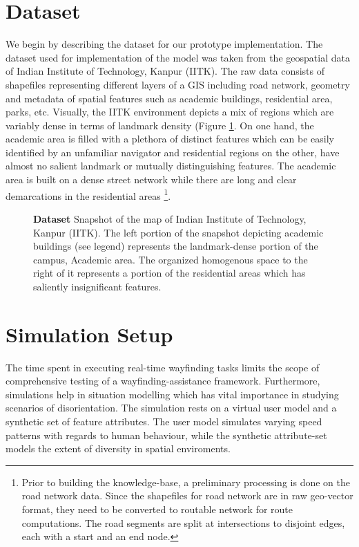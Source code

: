 \documentclass{iitkthesis}
\begin{document}
 \label{evaluation}
 \section{Dataset}
We begin by describing the dataset for our prototype implementation. The dataset used for implementation of the model was taken from the geospatial data of Indian Institute of Technology, Kanpur (IITK). The raw data consists of shapefiles representing different layers of a GIS including road network, geometry and metadata of spatial features such as academic buildings, residential area, parks, etc. Visually, the IITK environment depicts a mix of regions which are variably dense in terms of landmark density (Figure \ref{fig:dataset}. On one hand, the academic area is filled with a plethora of distinct features which can be easily identified by an unfamiliar navigator and residential regions on the other, have almost no salient landmark or mutually distinguishing features. The academic area is built on a dense street network while there are long and clear demarcations in the residential areas
\footnote{Prior to building the knowledge-base, a preliminary processing is done on the road network data. Since the shapefiles for road network are in raw geo-vector format, they need to be converted to routable network for route computations. The road segments are split at intersections to disjoint edges, each with a start and an end node.}.
\begin{figure}
\centering
{}
\caption{\textbf{\textbf{Dataset}} Snapshot of the map of Indian Institute of Technology, Kanpur (IITK). The left portion of the snapshot depicting academic buildings (see legend) represents the landmark-dense portion of the campus, Academic area. The organized homogenous space to the right of it represents a portion of the residential areas which has saliently insignificant features.}
\label{fig:dataset}
 \end{figure} 
 \section{Simulation Setup} 
The time spent in executing real-time wayfinding tasks limits the scope of comprehensive testing of a wayfinding-assistance framework. Furthermore, simulations help in situation modelling which has vital importance in studying scenarios of disorientation. The simulation rests on a virtual user model and a synthetic set of feature attributes. The user model simulates varying speed patterns with regards to human behaviour, while the synthetic attribute-set models the extent of diversity in spatial enviroments.
\end{document}
